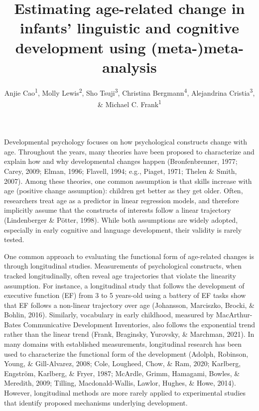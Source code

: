 \documentclass[
  man]{apa6}
\title{Estimating age-related change in infants' linguistic and cognitive development using (meta-)meta-analysis}
\author{Anjie Cao\textsuperscript{1}, Molly Lewis\textsuperscript{2}, Sho Tsuji\textsuperscript{3}, Christina Bergmann\textsuperscript{4}, Alejandrina Cristia\textsuperscript{3}, \& Michael C. Frank\textsuperscript{1}}
\date{}
\affiliation{\vspace{0.5cm}\textsuperscript{1} Stanford University\\\textsuperscript{2} Carnegie Mellon University\\\textsuperscript{3} École Normale Supérieure - PSL\\\textsuperscript{4} Hochschule Osnabrück}
\begin{document}
\maketitle

Developmental psychology focuses on how psychological constructs change with age. Throughout the years, many theories have been proposed to characterize and explain how and why developmental changes happen (Bronfenbrenner, 1977; Carey, 2009; Elman, 1996; Flavell, 1994; e.g., Piaget, 1971; Thelen \& Smith, 2007). Among these theories, one common assumption is that skills increase with age (positive change assumption): children get better as they get older. Often, researchers treat age as a predictor in linear regression models, and therefore implicitly assume that the constructs of interests follow a linear trajectory (Lindenberger \& Pötter, 1998). While both assumptions are widely adopted, especially in early cognitive and language development, their validity is rarely tested.

One common approach to evaluating the functional form of age-related changes is through longitudinal studies. Measurements of psychological constructs, when tracked longitudinally, often reveal age trajectories that violate the linearity assumption. For instance, a longitudinal study that follows the development of executive function (EF) from 3 to 5 years-old using a battery of EF tasks show that EF follows a non-linear trajectory over age (Johansson, Marciszko, Brocki, \& Bohlin, 2016). Similarly, vocabulary in early childhood, measured by MacArthur-Bates Communicative Development Inventories, also follows the exponential trend rather than the linear trend (Frank, Braginsky, Yurovsky, \& Marchman, 2021). In many domains with established measurements, longitudinal research has been used to characterize the functional form of the development (Adolph, Robinson, Young, \& Gill-Alvarez, 2008; Cole, Lougheed, Chow, \& Ram, 2020; Karlberg, Engström, Karlberg, \& Fryer, 1987; McArdle, Grimm, Hamagami, Bowles, \& Meredith, 2009; Tilling, Macdonald-Wallis, Lawlor, Hughes, \& Howe, 2014). However, longitudinal methods are more rarely applied to experimental studies that identify proposed mechanisms underlying development.
\end{document}
